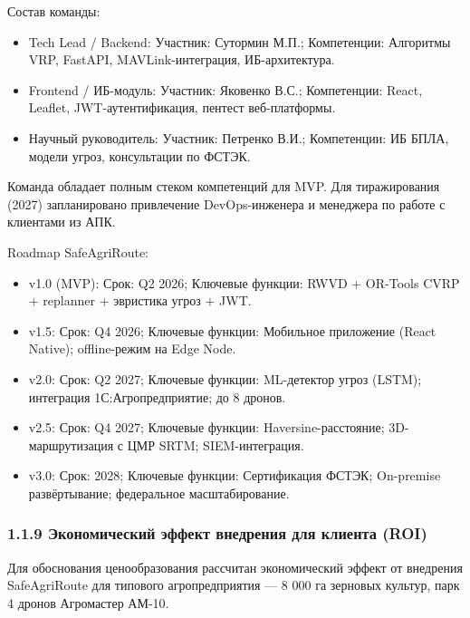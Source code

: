 \documentclass[14pt,a4paper]{extarticle}
\begin{document}
Состав команды:

\begin{itemize}
\item Tech Lead / Backend: Участник: Сутормин М.П.; Компетенции: Алгоритмы VRP, FastAPI, MAVLink-интеграция, ИБ-архитектура.
\item Frontend / ИБ-модуль: Участник: Яковенко В.С.; Компетенции: React, Leaflet, JWT-аутентификация, пентест веб-платформы.
\item Научный руководитель: Участник: Петренко В.И.; Компетенции: ИБ БПЛА, модели угроз, консультации по ФСТЭК.
\end{itemize}


Команда обладает полным стеком компетенций для MVP. Для тиражирования (2027) запланировано привлечение DevOps-инженера и менеджера по работе с клиентами из АПК.

Roadmap SafeAgriRoute:

\begin{itemize}
\item v1.0 (MVP): Срок: Q2 2026; Ключевые функции: RWVD + OR-Tools CVRP + replanner + эвристика угроз + JWT.
\item v1.5: Срок: Q4 2026; Ключевые функции: Мобильное приложение (React Native); offline-режим на Edge Node.
\item v2.0: Срок: Q2 2027; Ключевые функции: ML-детектор угроз (LSTM); интеграция 1С:Агропредприятие; до 8 дронов.
\item v2.5: Срок: Q4 2027; Ключевые функции: Haversine-расстояние; 3D-маршрутизация с ЦМР SRTM; SIEM-интеграция.
\item v3.0: Срок: 2028; Ключевые функции: Сертификация ФСТЭК; On-premise развёртывание; федеральное масштабирование.
\end{itemize}


\hypertarget{ux44dux43aux43eux43dux43eux43cux438ux447ux435ux441ux43aux438ux439-ux44dux444ux444ux435ux43aux442-ux432ux43dux435ux434ux440ux435ux43dux438ux44f-ux434ux43bux44f-ux43aux43bux438ux435ux43dux442ux430-roi}{%
\subsubsection{1.1.9 Экономический эффект внедрения для клиента (ROI)}\label{ux44dux43aux43eux43dux43eux43cux438ux447ux435ux441ux43aux438ux439-ux44dux444ux444ux435ux43aux442-ux432ux43dux435ux434ux440ux435ux43dux438ux44f-ux434ux43bux44f-ux43aux43bux438ux435ux43dux442ux430-roi}}

Для обоснования ценообразования рассчитан экономический эффект от внедрения SafeAgriRoute для типового агропредприятия --- 8 000 га зерновых культур, парк 4 дронов Агромастер АМ-10.
\end{document}
